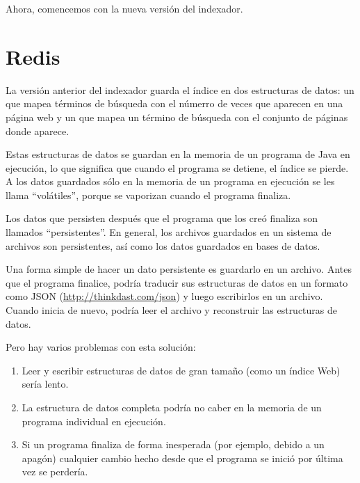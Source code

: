 \documentclass[12pt]{book}
\theoremstyle{exercise}
\begin{document}
Ahora, comencemos con la nueva versión del indexador.

\section{Redis}
\label{redis}


La versión anterior del indexador guarda el índice en dos estructuras
de datos: un  que mapea términos de búsqueda con el
númerro de veces que aparecen en una página web y un  que
mapea un término de búsqueda con el conjunto de páginas donde aparece.

Estas estructuras de datos se guardan en la memoria de un programa de
Java en ejecución, lo que significa que cuando el programa se detiene, el
índice se pierde. A los datos guardados sólo en la memoria de un programa
en ejecución se les llama ``volátiles'', porque se vaporizan cuando el
programa finaliza.


Los datos que persisten después que el programa que los creó finaliza son
llamados ``persistentes''. En general, los archivos guardados en un sistema de
archivos son persistentes, así como los datos guardados en bases de datos.


Una forma simple de hacer un dato persistente es guardarlo en un archivo. Antes
que el programa finalice, podría traducir sus estructuras de datos en un formato
como JSON (\url{http://thinkdast.com/json}) y luego escribirlos en un
archivo. Cuando inicia de nuevo, podría leer el archivo y reconstruir las
estructuras de datos.

Pero hay varios problemas con esta solución:

\begin{enumerate}
\item
  Leer y escribir estructuras de datos de gran tamaño (como un índice Web)
  sería lento.

\item
  La estructura de datos completa podría no caber en la memoria de un
  programa individual en ejecución.

\item
  Si un programa finaliza de forma inesperada (por ejemplo, debido a un apagón)
  cualquier cambio hecho desde que el programa se inició por última vez se perdería.

\end{enumerate}
\end{document}
